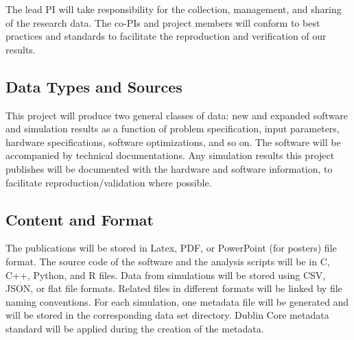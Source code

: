 {}


The lead PI will take responsibility for the collection, management, and sharing of
the research data.  The co-PIs and project members will conform to best practices and
standards to facilitate the reproduction and verification of our results.

\subsection*{Data Types and Sources}

This project will produce two general classes of data: new and expanded software
and simulation results as a function of problem specification, input
parameters, hardware specifications, software optimizations, and so on. The
software will be accompanied by technical documentations. Any simulation
results this project publishes will be documented with the hardware and software
information, to facilitate reproduction/validation where possible.

%
%
%

\subsection*{Content and Format}

The publications will be stored in Latex, PDF, or PowerPoint (for posters) file
format. The source code of the software and the analysis scripts will be in C,
C++, Python, and R files. Data from simulations will be
stored using CSV, JSON, or flat file formats. Related files in different formats
will be linked by file naming conventions. For each simulation, one
metadata file will be generated and will be stored in the corresponding data set
directory. Dublin Core metadata standard will be applied during the creation of
the metadata.


